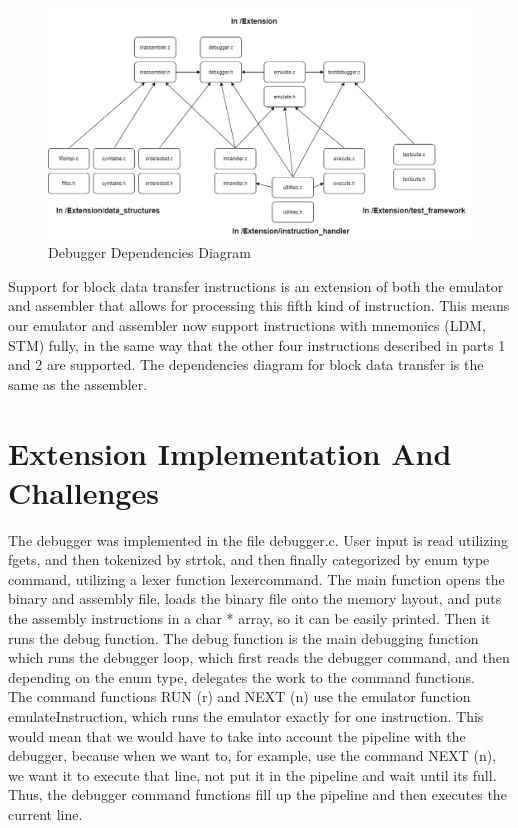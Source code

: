 \documentclass[11pt]{article}
\begin{document}
\begin{figure}[htp]
    \centering
    \includegraphics[width=17cm]{IncludesDiagramDebugger.png}
    \caption{Debugger Dependencies Diagram}
\end{figure}

Support for block data transfer instructions is an extension of both the emulator and assembler that allows for processing this fifth kind of instruction. This means our emulator and assembler now support instructions with mnemonics (LDM, STM) fully, in the same way that the other four instructions described in parts 1 and 2 are supported. The dependencies diagram for block data transfer is the same as the assembler.


\section{Extension Implementation And Challenges}
The debugger was implemented in the file debugger.c. User input is read utilizing fgets, and then tokenized by strtok, and then finally categorized by enum type command, utilizing a lexer function lexercommand. The main function opens the binary and assembly file, loads the binary file onto the memory layout, and puts the assembly instructions in a char * array, so it can be easily printed. Then it runs the debug function. The debug function is the main debugging function which runs the debugger loop, which first reads the debugger command, and then depending on the enum type, delegates the work to the command functions. \\

The command functions RUN (r) and NEXT (n) use the emulator function emulateInstruction, which runs the emulator exactly for one instruction. This would mean that we would have to take into account the pipeline with the debugger, because when we want to, for example, use the command NEXT (n), we want it to execute that line, not put it in the pipeline and wait until its full. Thus, the debugger command functions fill up the pipeline and then executes the current line.\\
\end{document}
